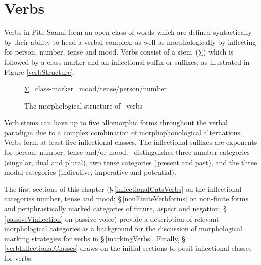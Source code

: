 

\chapter{Verbs}\label{verbs}
Verbs in Pite Saami form an open class of words which are defined syntactically by their ability to head a verbal complex, as well as morphologically by inflecting for person, number, tense and mood. 
Verbs consist of a \mbox{stem (∑)} which is followed by a class marker and an inflectional suffix or suffixes, %
as illustrated in Figure \vref{verbStructure}. %

\begin{figure}[h]\centering
∑ \PLUS\ class-marker \PLUS\ mood/tense/person/number%
\caption{The morphological structure of \PS\ verbs}\label{verbStructure}
\end{figure}

Verb stems can have up to five allomorphic forms throughout the verbal para\-digm due to a complex combination of morphophonological alternations. 
Verbs form at least five inflectional classes. 
The inflectional suffixes are exponents for person, number, tense and/or mood. 
\PS\ distinguishes three number categories (singular, dual and plural), two tense categories (present and past), and the three modal categories (indicative, imperative and potential). 


The first sections of this chapter (§\,\ref{inflectionalCatsVerbs} on the inflectional categories number, tense and mood; §\,\ref{nonFiniteVerbforms} on non-finite forms and periphrastically marked categories of future, aspect and negation; §\,\ref{passiveVinflection} on passive voice) provide a description of relevant morphological categories as a background for the discussion of morphological marking strategies for verbs in §\,\ref{markingVerbs}. Finally, §\,\ref{verbInflectionalClasses} draws on the initial sections to posit inflectional classes for verbs. 


